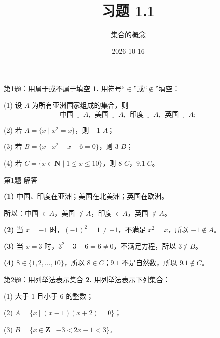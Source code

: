 \documentclass[10pt,aspectratio=169,serif]{beamer}
\title[习题1.1]{习题 1.1}
\subtitle{集合的概念}
\author{}
\institute{}
\date{2026-10-16}
\begin{document}
\begin{frame}
  \titlepage
\end{frame}

\begin{frame}[t]{第1题：用属于或不属于填空}
\textbf{1.} 用符号“$\in$”或“$\notin$”填空：

\vspace{0.5em}
(1) 设 $A$ 为所有亚洲国家组成的集合，则
\[
\text{中国}\ \underline{\hspace{1em}}\ A,\ \ \text{美国}\ \underline{\hspace{1em}}\ A,\ \ \text{印度}\ \underline{\hspace{1em}}\ A,\ \ \text{英国}\ \underline{\hspace{1em}}\ A;
\]

(2) 若 $A = \{x \mid x^2 = x\}$，则 $-1$ \underline{\hspace{1em}} $A$；

(3) 若 $B = \{x \mid x^2 + x - 6 = 0\}$，则 $3$ \underline{\hspace{1em}} $B$；

(4) 若 $C = \{x \in \mathbf{N} \mid 1 \le x \le 10\}$，则 $8$ \underline{\hspace{1em}} $C$，$9.1$ \underline{\hspace{1em}} $C$。
\end{frame}

\begin{frame}[t]{第1题 解答}
\begin{tcolorbox}[colback=orange!10,colframe=orange,title=\textbf{解}]
\textbf{(1)} 中国、印度在亚洲；美国在北美洲；英国在欧洲。

所以：中国 $\in A$，美国 $\notin A$，印度 $\in A$，英国 $\notin A$。

\vspace{0.5em}
\textbf{(2)} 当 $x = -1$ 时，$(-1)^2 = 1 \ne -1$，不满足 $x^2 = x$，所以 $-1 \notin A$。

\vspace{0.5em}
\textbf{(3)} 当 $x = 3$ 时，$3^2 + 3 - 6 = 6 \ne 0$，不满足方程，所以 $3 \notin B$。

\vspace{0.5em}
\textbf{(4)} $8 \in \{1,2,\dots,10\}$，所以 $8 \in C$；$9.1$ 不是自然数，所以 $9.1 \notin C$。
\end{tcolorbox}
\end{frame}

\begin{frame}[t]{第2题：用列举法表示集合}
\textbf{2.} 用列举法表示下列集合：

\vspace{0.5em}
(1) 大于 $1$ 且小于 $6$ 的整数；

\vspace{0.5em}
(2) $A = \{x \mid (x-1)(x+2) = 0\}$；

\vspace{0.5em}
(3) $B = \{x \in \mathbf{Z} \mid -3 < 2x - 1 < 3\}$。
\end{frame}
\end{document}

